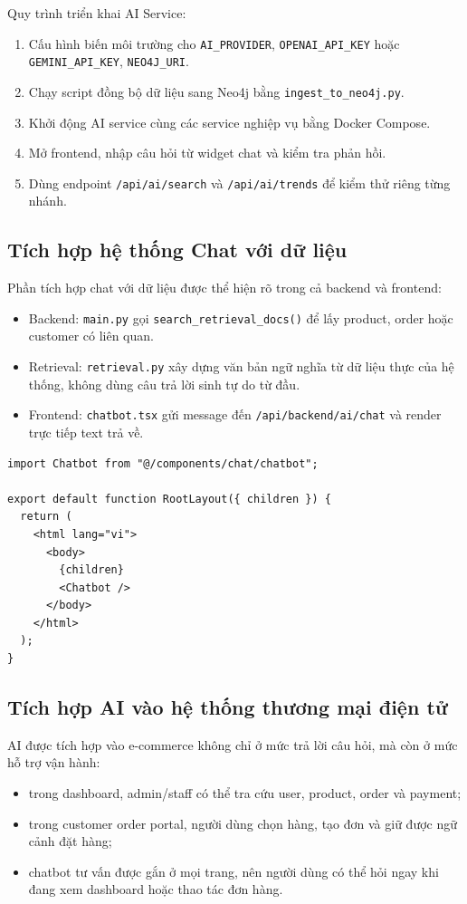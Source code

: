 \documentclass[12pt,a4paper]{article}
\begin{document}
Quy trình triển khai AI Service:
\begin{enumerate}
  \item Cấu hình biến môi trường cho \texttt{AI\_PROVIDER}, \texttt{OPENAI\_API\_KEY} hoặc \texttt{GEMINI\_API\_KEY}, \texttt{NEO4J\_URI}.
  \item Chạy script đồng bộ dữ liệu sang Neo4j bằng \texttt{ingest\_to\_neo4j.py}.
  \item Khởi động AI service cùng các service nghiệp vụ bằng Docker Compose.
  \item Mở frontend, nhập câu hỏi từ widget chat và kiểm tra phản hồi.
  \item Dùng endpoint \texttt{/api/ai/search} và \texttt{/api/ai/trends} để kiểm thử riêng từng nhánh.
\end{enumerate}

\subsection{Tích hợp hệ thống Chat với dữ liệu}
Phần tích hợp chat với dữ liệu được thể hiện rõ trong cả backend và frontend:
\begin{itemize}
  \item Backend: \texttt{main.py} gọi \texttt{search\_retrieval\_docs()} để lấy product, order hoặc customer có liên quan.
  \item Retrieval: \texttt{retrieval.py} xây dựng văn bản ngữ nghĩa từ dữ liệu thực của hệ thống, không dùng câu trả lời sinh tự do từ đầu.
  \item Frontend: \texttt{chatbot.tsx} gửi message đến \texttt{/api/backend/ai/chat} và render trực tiếp text trả về.
\end{itemize}

\begin{lstlisting}[style=code,caption={Khung chat nổi trên frontend được gắn toàn cục}]
import Chatbot from "@/components/chat/chatbot";

export default function RootLayout({ children }) {
  return (
    <html lang="vi">
      <body>
        {children}
        <Chatbot />
      </body>
    </html>
  );
}
\end{lstlisting}

\subsection{Tích hợp AI vào hệ thống thương mại điện tử}
AI được tích hợp vào e-commerce không chỉ ở mức trả lời câu hỏi, mà còn ở mức hỗ trợ vận hành:
\begin{itemize}
  \item trong dashboard, admin/staff có thể tra cứu user, product, order và payment;
  \item trong customer order portal, người dùng chọn hàng, tạo đơn và giữ được ngữ cảnh đặt hàng;
  \item chatbot tư vấn được gắn ở mọi trang, nên người dùng có thể hỏi ngay khi đang xem dashboard hoặc thao tác đơn hàng.
\end{itemize}
\end{document}
